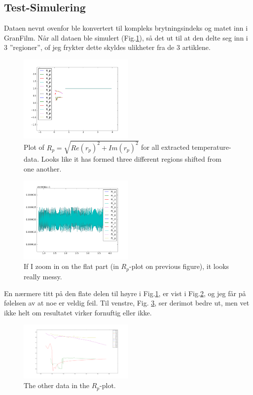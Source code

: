 \subsection{Test-Simulering}
Dataen nevnt ovenfor ble konvertert til kompleks brytningsindeks og matet inn i GranFilm.
Når all dataen ble simulert (Fig.\ref{figAllD}), så det ut til at den delte seg inn 
i 3 ''regioner'', of jeg frykter dette skyldes ulikheter fra de 3 artiklene.
%
\begin{figure}[h!] 
\centering 
\includegraphics[width=0.5\textwidth]{Figures/vo2RpAll.png} 
\caption{Plot of $R_p = \sqrt{Re(r_p)^2 + Im(r_p)^2}$ for all extracted temperature-data.
Looks like it has formed three different regions shifted from one another.}
\label{figAllD}
\end{figure}
%
%
\begin{figure}[h!] 
\centering 
\includegraphics[width=0.5\textwidth]{Figures/kangDataSimulated.png} 
\caption{If I zoom in on the flat part (in $R_p$-plot on previous figure), it looks really messy.}
\label{figAllD1}
\end{figure}
%
En nærmere titt på den flate delen til høyre i Fig.\ref{figAllD}, er vist 
i Fig.\ref{figAllD1}, og jeg får på følelsen av at noe er veldig feil.
Til venstre, Fig. \ref{figAllD2}, ser derimot bedre ut, men vet ikke helt
om resultatet virker fornuftig eller ikke.
%
\begin{figure}[h!] 
\centering 
\includegraphics[width=0.5\textwidth]{Figures/niceData.png} 
\caption{The other data in the $R_p$-plot.}
\label{figAllD2}
\end{figure}
%


